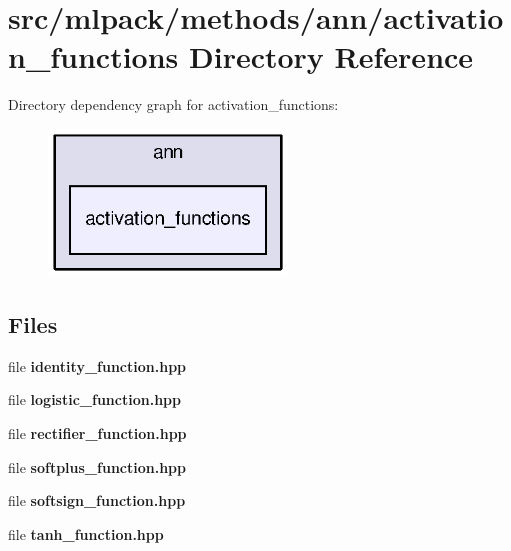 \section{src/mlpack/methods/ann/activation\+\_\+functions Directory Reference}
\label{dir_a05b89e13e21ccb1d653eec334a23617}
Directory dependency graph for activation\+\_\+functions\+:
\nopagebreak
\begin{figure}[H]
\begin{center}
\leavevmode
\includegraphics[width=180pt]{dir_a05b89e13e21ccb1d653eec334a23617_dep}
\end{center}
\end{figure}
\subsection*{Files}
\begin{DoxyCompactItemize}
\item 
file {\bf identity\+\_\+function.\+hpp}
\item 
file {\bf logistic\+\_\+function.\+hpp}
\item 
file {\bf rectifier\+\_\+function.\+hpp}
\item 
file {\bf softplus\+\_\+function.\+hpp}
\item 
file {\bf softsign\+\_\+function.\+hpp}
\item 
file {\bf tanh\+\_\+function.\+hpp}
\end{DoxyCompactItemize}
